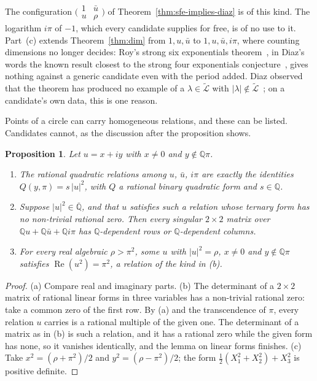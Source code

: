 \documentclass[11pt,a4paper]{article}
\theoremstyle{plain}
\newtheorem{proposition}[theorem]{Proposition}
\theoremstyle{definition}
\newcommand{\Q}{\mathbb{Q}}
\newcommand{\Alg}{\overline{\mathbb{Q}}}
\newcommand{\aLogs}{\widetilde{\mathcal{L}}}
\begin{document}
The configuration $\bigl(\begin{smallmatrix}1&\bar u\\u&\rho\end{smallmatrix}\bigr)$ of
Theorem~\ref{thm:sfe-implies-diaz} is of this kind. The logarithm $i\pi$ of $-1$, which every
candidate supplies for free, is of no use to it. Part~(c) extends Theorem~\ref{thm:dim} from
$1,u,\bar u$ to $1,u,\bar u,i\pi$, where counting dimensions no longer decides: Roy's strong six
exponentials theorem~\cite{roy-1992}, in Diaz's words the known result closest to the strong four
exponentials conjecture~\cite[p.~379]{diaz-2007}, gives nothing against a generic candidate even
with the period added. Diaz observed
that the theorem has produced no example of a $\lambda\in\aLogs$ with
$|\lambda|\notin\aLogs$~\cite{diaz-2007}; on a candidate's own data, this is one reason.

Points of a circle can carry homogeneous relations, and these can be listed. Candidates cannot, as
the discussion after the proposition shows.

\begin{proposition}\label{prop:relations}
Let $u=x+iy$ with $x\neq0$ and $y\notin\Q\pi$.
\begin{enumerate}[label=\textup{(\alph*)}]
  \item The rational quadratic relations among $u$, $\bar u$, $i\pi$ are exactly the identities
        $Q(y,\pi)=s\,|u|^{2}$, with $Q$ a rational binary quadratic form and $s\in\Q$.
  \item Suppose $|u|^{2}\in\Alg$, and that $u$ satisfies such a relation whose ternary form has no
        non-trivial rational zero. Then every singular $2\times2$ matrix over
        $\Q u+\Q\bar u+\Q i\pi$ has $\Q$-dependent rows or $\Q$-dependent columns.
  \item For every real algebraic $\rho>\pi^{2}$, some $u$ with $|u|^{2}=\rho$, $x\neq0$ and
        $y\notin\Q\pi$ satisfies $\operatorname{Re}(u^{2})=\pi^{2}$, a relation of the kind in (b).
\end{enumerate}
\end{proposition}

\begin{proof}
(a) Compare real and imaginary parts. (b) The determinant of a $2\times2$ matrix of rational
linear forms in three variables has a non-trivial rational zero: take a common zero of the first
row. By (a) and the transcendence of $\pi$, every relation $u$ carries is a rational multiple of
the given one. The determinant of a matrix as in (b) is such a relation, and it has a rational
zero while the given form has none, so it vanishes identically, and the lemma on linear forms
finishes. (c) Take $x^{2}=(\rho+\pi^{2})/2$ and $y^{2}=(\rho-\pi^{2})/2$; the form
$\tfrac12(X_{1}^{2}+X_{2}^{2})+X_{3}^{2}$ is positive definite.
\end{proof}
\end{document}

